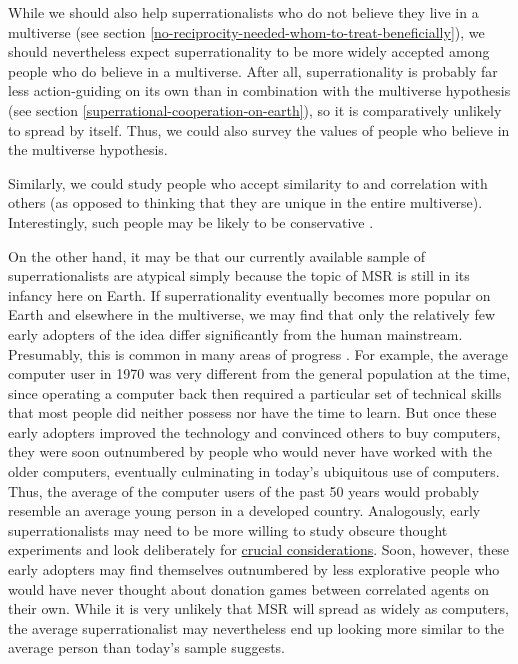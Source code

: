 While we should also help superrationalists who do not believe they live
in a multiverse (see section
\ref{no-reciprocity-needed-whom-to-treat-beneficially}), we should nevertheless expect superrationality to be
more widely accepted among people who do believe in a multiverse. After
all, superrationality is probably far less action-guiding on its own
than in combination with the multiverse hypothesis (see section
\ref{superrational-cooperation-on-earth}), so it is comparatively unlikely to spread by
itself. Thus, we could also survey the values of people who believe in
the multiverse hypothesis.

Similarly, we could study people who accept similarity to and
correlation with others (as opposed to thinking that they are unique in
the entire multiverse). Interestingly, such people may be likely to be
conservative \parencite{stern2014liberal}.

On the other hand, it may be that our currently available sample of
superrationalists are atypical simply because the topic of MSR is still
in its infancy here on Earth. If superrationality eventually becomes
more popular on Earth and elsewhere in the multiverse, we may find that
only the relatively few early adopters of the idea differ significantly
from the human mainstream. Presumably, this is common in many areas of
progress \parencite[cf.][chapter 7]{Rogers2010-hg}. For example, the average
computer user in 1970 was very different from the general population at
the time, since operating a computer back then required a particular set
of technical skills that most people did neither possess nor have the
time to learn. But once these early adopters improved the technology and
convinced others to buy computers, they were soon outnumbered by people
who would never have worked with the older computers, eventually
culminating in today's ubiquitous use of computers. Thus, the average of
the computer users of the past 50 years would probably resemble an
average young person in a developed country. Analogously, early
superrationalists may need to be more willing to study obscure thought
experiments and look deliberately for
\href{https://concepts.effectivealtruism.org/concepts/the-importance-of-crucial-considerations/}{crucial
considerations}. Soon, however, these early adopters may find
themselves outnumbered by less explorative people who would have never
thought about donation games between correlated agents on their own.
While it is very unlikely that MSR will spread as widely as computers,
the average superrationalist may nevertheless end up looking more
similar to the average person than today's sample suggests.

